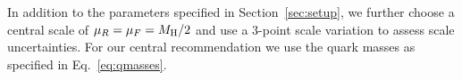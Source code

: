 

In addition to the parameters specified in Section~\ref{sec:setup}, we further choose a central scale of $\mu_R=\mu_F=M_\mathrm{H}/2$ and use a 3-point scale variation to assess scale uncertainties.
For our central recommendation we use the quark masses as specified in Eq.~\eqref{eq:qmasses}.

